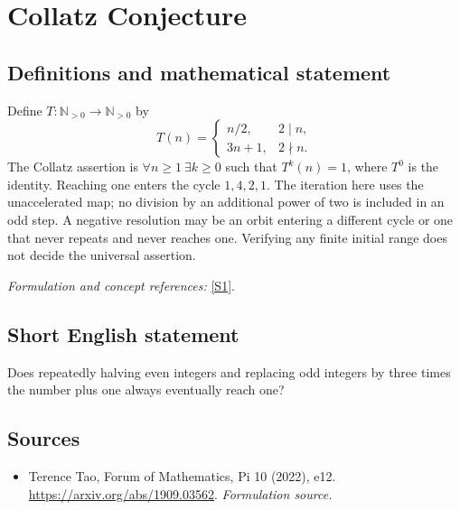 \documentclass[11pt]{article}
\begin{document}
\section*{\texorpdfstring{Collatz Conjecture}{Collatz Conjecture}}\label{9}
\subsection{Definitions and mathematical statement}
Define $T:{\mathbb{N}}_{>0}\to{\mathbb{N}}_{>0}$ by
\[
 T(n)=\begin{cases}n/2,&2\mid n,\\3n+1,&2\nmid n.\end{cases}
\]
The Collatz assertion is $\forall n\ge1\ \exists k\ge0$ such that $T^k(n)=1$, where $T^0$ is the identity. Reaching one enters the cycle $1,4,2,1$. The iteration here uses the unaccelerated map; no division by an additional power of two is included in an odd step. A negative resolution may be an orbit entering a different cycle or one that never repeats and never reaches one. Verifying any finite initial range does not decide the universal assertion.
\par\smallskip\textit{Formulation and concept references:} \href{https://arxiv.org/abs/1909.03562}{[S1]}.

\subsection{Short English statement}
Does repeatedly halving even integers and replacing odd integers by three times the number plus one always eventually reach one?
\subsection{Sources}
\begin{itemize}
\item[S1]Terence Tao, Forum of Mathematics, Pi 10 (2022), e12.
\url{https://arxiv.org/abs/1909.03562}.
\textit{Formulation source.}
\end{itemize}
\end{document}
